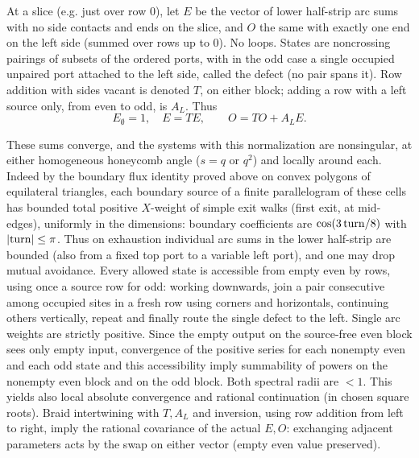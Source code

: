 At a slice (e.g. just over row 0), let \(E\) be the vector of lower half-strip arc sums with no side contacts and ends on the slice, and \(O\) the same with exactly one end on the left side (summed over rows up to 0). No loops. States are noncrossing pairings of subsets of the ordered ports, with in the odd case a single occupied unpaired port attached to the left side, called the defect (no pair spans it). Row addition with sides vacant is denoted \(T\), on either block; adding a row with a left source only, from even to odd, is \(A_L\). Thus
\[
 E_\emptyset=1,\quad E=T E,\qquad O=T O+A_L E .
\]

These sums converge, and the systems with this normalization are nonsingular, at either homogeneous honeycomb angle (\(s=q\) or \(q^2\)) and locally around each. Indeed by the boundary flux identity proved above on convex polygons of equilateral triangles, each boundary source of a finite parallelogram of these cells has bounded total positive \(X\)-weight of simple exit walks (first exit, at mid-edges), uniformly in the dimensions: boundary coefficients are \(\cos(3\,{\rm turn}/8)\) with \(|{\rm turn}|\le\pi\). Thus on exhaustion individual arc sums in the lower half-strip are bounded (also from a fixed top port to a variable left port), and one may drop mutual avoidance. Every allowed state is accessible from empty even by rows, using once a source row for odd: working downwards, join a pair consecutive among occupied sites in a fresh row using corners and horizontals, continuing others vertically, repeat and finally route the single defect to the left. Single arc weights are strictly positive. Since the empty output on the source-free even block sees only empty input, convergence of the positive series for each nonempty even and each odd state and this accessibility imply summability of powers on the nonempty even block and on the odd block. Both spectral radii are \(<1\). This yields also local absolute convergence and rational continuation (in chosen square roots). Braid intertwining with \(T,A_L\) and inversion, using row addition from left to right, imply the rational covariance of the actual \(E,O\): exchanging adjacent parameters acts by the swap on either vector (empty even value preserved).

